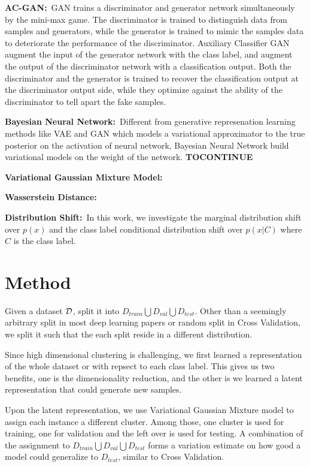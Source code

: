 \documentclass{article}
\begin{document}
\textbf{AC-GAN:}\, GAN \cite{FIXME} trains a discriminator and generator network simultaneously by the mini-max game. The discriminator is trained to distinguish data from samples and generators, while the generator is trained to mimic the samples data to deteriorate the performance of the discriminator. Auxiliary Classifier GAN \cite{FIXME} augment the input of the generator network with the class label, and augment the output of the discriminator network with a classification output. Both the discriminator and the generator is trained to recover the classification output at the discriminator output side, while they optimize against the ability of the discriminator to tell apart the fake samples. 


\textbf{Bayesian Neural Network:}\, Different from generative represenation learning methods like VAE \cite{FIXME} and GAN \cite{FIXME} which models a variational approximator to the true posterior on the activation of neural network, Bayesian Neural Network build variational models on the weight of the network. \textbf{TOCONTINUE} 
 
\textbf{Variational Gaussian Mixture Model:}\,

\textbf{Wasserstein Distance:}\,

\textbf{Distribution Shift:}\, In this work, we investigate the marginal distribution shift over $p(x)$ and the class label conditional distribution shift over $p(x|C)$ where $C$ is the class label.

\section{Method}
Given a dataset $\mathcal{D}$, split it into $D_{train} \bigcup D_{val} \bigcup D_{test}$. Other than a seemingly arbitrary split in most deep learning papers or random split in Cross Validation, we split it such that the each split reside in a different distribution.

Since high dimensional clustering is challenging, we first learned a representation of the whole dataset or with repsect to each class label. This gives us two benefits, one is the dimensionality reduction, and the other is we learned a latent representation that could generate new samples.

Upon the latent representation, we use Variational Gaussian Mixture model to assign each instance a different cluster. Among those, one cluster is used for training, one for validation and the left over is used for testing. A combination of the assignment to $D_{train} \bigcup D_{val} \bigcup D_{test}$ forms a variation estimate on how good a model could generalize to $D_{test}$, similar to Cross Validation.
\end{document}
